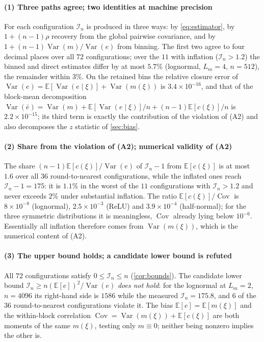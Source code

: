 \documentclass[twocolumn,review,hidelinks,oneeqnum,onetabnum,onefignum,onethmnum]{siamart251216}
\begin{document}
\paragraph{(1) Three paths agree; two identities at machine precision} For each
configuration $\mathcal I_n$ is produced in three ways: by \cref{eq:estimator},
by $1+(n-1)\rho$ recovery from the global pairwise covariance, and by
$1+(n-1)\operatorname{Var}(m)/\operatorname{Var}(e)$ from binning. The first two
agree to four decimal places over all $72$ configurations; over the $11$ with
inflation ($\mathcal I_n>1.2$) the binned and direct estimates differ by at most
$5.7\%$ (lognormal, $L_m=4$, $n=512$), the remainder within $3\%$. On the retained
bins the relative closure error of
$\operatorname{Var}(e)=\mathbb{E}[\operatorname{Var}(e\mid\xi)]+\operatorname{Var}(m(\xi))$
is $3.4\times10^{-16}$, and that of the block-mean decomposition
$\operatorname{Var}(\bar e)=\operatorname{Var}(m)+\mathbb{E}[\operatorname{Var}(e\mid\xi)]/n+(n-1)\mathbb{E}[c(\xi)]/n$
is $2.2\times10^{-15}$; its third term is exactly the contribution of the
violation of (A2) and also decomposes the $z$ statistic of \cref{sec:bias}.

\paragraph{(2) Share from the violation of (A2); numerical validity of (A2)} The
share $(n-1)\mathbb{E}[c(\xi)]/\operatorname{Var}(e)$ of $\mathcal I_n-1$ from
$\mathbb{E}[c(\xi)]$ is at most $1.6$ over all $36$ round-to-nearest
configurations, while the inflated ones reach $\mathcal I_n-1=175$: it is $1.1\%$
in the worst of the $11$ configurations with $\mathcal I_n>1.2$ and never exceeds
$2\%$ under substantial inflation. The ratio
$\mathbb{E}[c(\xi)]/\operatorname{Cov}$ is $8\times10^{-8}$ (lognormal),
$2.5\times10^{-3}$ (ReLU) and $3.9\times10^{-4}$ (half-normal); for the three
symmetric distributions it is meaningless, $\operatorname{Cov}$ already lying below
$10^{-6}$. Essentially all inflation therefore comes from
$\operatorname{Var}(m(\xi))$, which is the numerical content of (A2).

\paragraph{(3) The upper bound holds; a candidate lower bound is refuted} All $72$
configurations satisfy $0\le\mathcal I_n\le n$ (\cref{cor:bounds}). The candidate
lower bound $\mathcal I_n\ge n(\mathbb{E}[e])^2/\operatorname{Var}(e)$ \emph{does
not hold}: for the lognormal at $L_m=2$, $n=4096$ its right-hand side is $1586$
while the measured $\mathcal I_n=175.8$, and $6$ of the $36$ round-to-nearest
configurations violate it. The bias $\mathbb{E}[e]=\mathbb{E}[m(\xi)]$ and the
within-block correlation
$\operatorname{Cov}=\operatorname{Var}(m(\xi))+\mathbb{E}[c(\xi)]$ are both moments
of the same $m(\xi)$, testing only $m\equiv0$; neither being nonzero implies the
other is.
\end{document}
